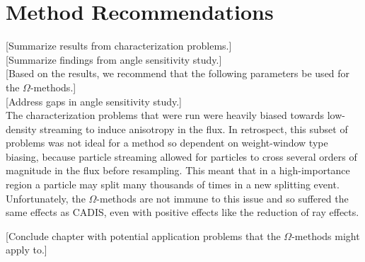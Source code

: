 \section{Method Recommendations}
\label{sec:method_recs}

[Summarize results from characterization problems.] \\

[Summarize findings from angle sensitivity study.] \\

[Based on the results, we recommend that the following parameters be used for
the $\Omega$-methods.] \\

[Address gaps in angle sensitivity study.] \\

The characterization problems that were run were heavily biased towards
low-density streaming to induce anisotropy in the flux. In retrospect, this subset of
problems was not ideal for a method so dependent on weight-window type biasing,
because particle streaming allowed for particles to cross several orders of
magnitude in the flux before resampling. This meant that in a high-importance
region a particle may split many thousands of times in a new splitting event.
Unfortunately, the $\Omega$-methods are not immune to this issue and so suffered
the same effects as CADIS, even with positive effects like the reduction of ray
effects.

[Conclude chapter with potential application problems that the $\Omega$-methods
might apply to.] \\
